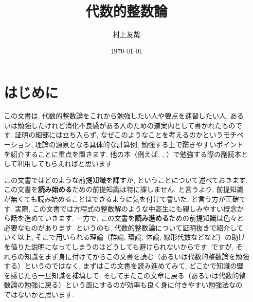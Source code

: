 \documentclass[11pt,b5paper,oneside,titlepage,lualatex]{ltjsreport}
\begin{document}

\title{代数的整数論}
\author{村上友哉}
\date{\today}
\maketitle



\chapter*{はじめに} \label{chap:intro}


この文書は, 代数的整数論をこれから勉強したい人や要点を速習したい人, あるいは勉強したけれど消化不良感がある人のための道案内として書かれたものです. 
証明の細部には立ち入らず, なぜこのようなことを考えるのかというモチベーション, 理論の源泉となる具体的な計算例, 勉強する上で躓きやすいポイントを紹介することに重点を置きます. 
他の本（例えば\cite{Yukie1}, \cite{Yukie2}, \cite{Neu}）で勉強する際の副読本として利用してもらえればと思います. 

この文書ではどのような前提知識を課すか, ということについて述べておきます. 
この文書を\textbf{読み始める}ための前提知識は特に課しません. 
と言うより, 前提知識が無くても読み始めることはできるように気を付けて書いた, と言う方が正確です. 
実際, この文書では方程式の整数解のような中高生にも親しみやすい概念から話を進めていきます. 
一方で, この文書を\textbf{読み進める}ための前提知識は色々と必要なものがあります. 
というのも, 代数的整数論について証明抜きで紹介していく以上, そこで用いられる理論（群論, 環論, 体論, 線形代数などなど）の助けを借りた説明になってしまうのはどうしても避けられないからです. 
ですが, それらの知識をまず身に付けてからこの文書を読む（あるいは代数的整数論を勉強する）というのではなく, まずはこの文書を読み進めてみて, どこかで知識の壁を感じたら一旦知識を補填して, そしてまたこの文章に戻る（あるいは代数的整数論の勉強に戻る）という風にするのが効率も良く身に付きやすい勉強法なのではないかと思います. 


\begin{quote}
	\centering
	[工事中]
\end{quote}


\end{document}
